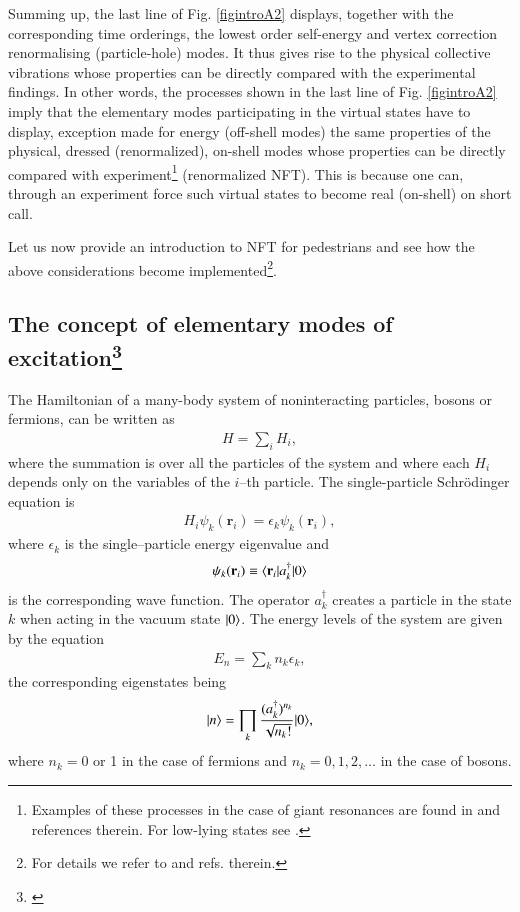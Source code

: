 Summing up, the last line of Fig. \ref{figintroA2} displays, together with the corresponding time orderings, the lowest order self-energy and vertex correction renormalising (particle-hole) modes. It thus gives rise to the physical collective vibrations whose properties can be directly compared with the experimental findings. In other words, the processes shown in the last line of   Fig. \ref{figintroA2} imply that the elementary modes participating in the virtual states have to display, exception made for energy (off-shell modes) the same properties of the physical, dressed (renormalized), on-shell modes whose properties can be directly compared with experiment\footnote{Examples of these processes in the case of giant resonances are found in \cite{Bortignon:81,Bertsch:83} and references therein. For low-lying states see \cite{Barranco:04}.} (renormalized NFT). This is because one can, through an experiment
force such virtual states to become real (on-shell) on short call.

Let us now provide an introduction to NFT for pedestrians and see how the above considerations become  implemented\footnote{For details we refer to \cite{Bortignon:77} and refs. therein.}.
\subsection[The concept of elementary modes of excitation]{The concept of elementary modes of excitation\protect\footnote{\cite{Bes:77}}}\label{C1S7.1}
The Hamiltonian of a many-body system of noninteracting particles, bosons or fermions, can be written as
\begin{align}\label{eqC1A1}
H=\sum_iH_i,
\end{align}
where the summation is over all the particles of the system and where each $H_i$ depends only on the variables of the $i$--th particle. The single-particle Schr\"odinger equation is
\begin{align}\label{eqC1A2}
H_i\psi_k(\mathbf r_i)=\epsilon_k \psi_k(\mathbf r_i),
\end{align}
where $\epsilon_k$ is the single--particle energy eigenvalue and 
\begin{align}\label{eqC1A3}
\psi_k(\mathbf r_i)\equiv\langle {\mathbf r_i}|a_k^\dagger|{0} \rangle
\end{align}
is the corresponding wave function. The operator $a_k^\dagger$ creates a particle in the state $k$ when acting in the vacuum state $|{0} \rangle$. The energy levels of the system are given by the equation
\begin{align}\label{eqC1A4}
E_n=\sum_k n_k\epsilon_k,
\end{align}
the corresponding eigenstates being
\begin{align}\label{eqC1A5}
|{n} \rangle=\prod_k\frac{(a_k^\dagger)^{n_k}}{\sqrt{n_k!}}|{0} \rangle,
\end{align}
where $n_k=0$ or 1 in the case of fermions and $n_k=0,1,2,\dots$ in the case of bosons.

